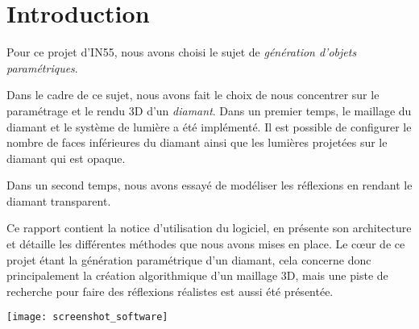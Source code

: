 \section{Introduction}

Pour ce projet d'IN55, nous avons choisi le sujet de \emph{génération
d'objets paramétriques}.

Dans le cadre de ce sujet, nous avons fait le choix de nous concentrer sur le paramétrage
et le rendu 3D d'un \emph{diamant}.
Dans un premier temps, le maillage du diamant et le système de lumière a été implémenté.
Il est possible de configurer le nombre de faces inférieures du diamant ainsi que
les lumières projetées sur le diamant qui est opaque.

Dans un second temps, nous avons essayé de modéliser les réflexions en rendant le diamant
transparent.

Ce rapport contient la notice d'utilisation du logiciel, en présente son architecture
et détaille les différentes méthodes que nous avons mises en place.
Le cœur de ce projet étant la génération paramétrique d'un diamant, cela concerne
donc principalement la création algorithmique d'un maillage 3D, mais une piste de
recherche pour faire des réflexions réalistes est aussi été présentée.

{\centering \texttt{[image: screenshot\_software]}}


